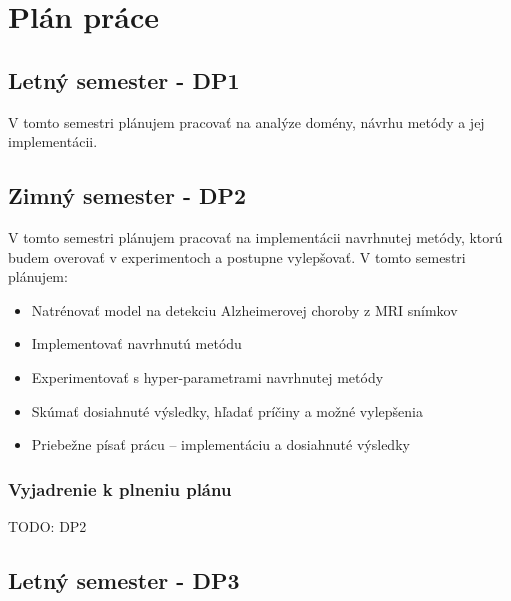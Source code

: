 \chapter{Plán práce \label{cha:plan}}

\setcounter{page}{1}

\section{Letný semester - DP1}

V tomto semestri plánujem pracovať na analýze domény, návrhu metódy a jej implementácii.

\section{Zimný semester - DP2}

    
    V tomto semestri plánujem pracovať na implementácii navrhnutej metódy, ktorú budem overovať v experimentoch a postupne vylepšovať. V tomto semestri plánujem:
    
    \begin{itemize}
        \item Natrénovať model na detekciu Alzheimerovej choroby z MRI snímkov
        \item Implementovať navrhnutú metódu
        \item Experimentovať s hyper-parametrami navrhnutej metódy
        \item Skúmať dosiahnuté výsledky, hľadať príčiny a možné vylepšenia
        \item Priebežne písať prácu -- implementáciu a dosiahnuté výsledky
    \end{itemize}

    \subsection{Vyjadrenie k plneniu plánu}

    TODO: DP2


\section{Letný semester - DP3}

    
